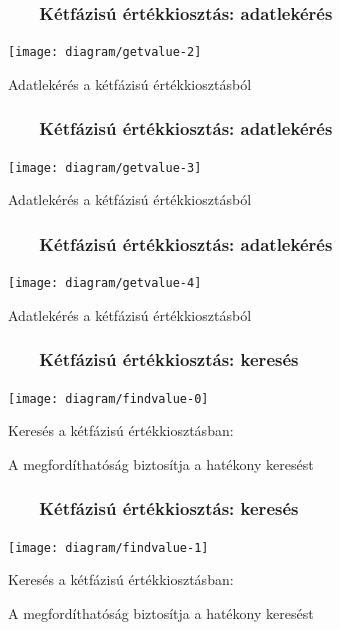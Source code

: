 \documentclass{beamer}
\newcommand{\slidetitle}[2]{\frametitle{{\small #1 ~ \ding{226} ~ } #2}}
\begin{document}
\begin{frame}[noframenumbering]
    \slidetitle{\sectiontitle}{Kétfázisú értékkiosztás: adatlekérés}
    
    \centering
    
    \texttt{[image: diagram/getvalue-2]}
    
    \hspace{0.7cm}
    
    Adatlekérés a kétfázisú értékkiosztásból
\end{frame}

\begin{frame}[noframenumbering]
    \slidetitle{\sectiontitle}{Kétfázisú értékkiosztás: adatlekérés}
    
    \centering
    
    \texttt{[image: diagram/getvalue-3]}
    
    \hspace{0.7cm}
    
    Adatlekérés a kétfázisú értékkiosztásból
\end{frame}

\begin{frame}[noframenumbering]
    \slidetitle{\sectiontitle}{Kétfázisú értékkiosztás: adatlekérés}
    
    \centering
    
    \texttt{[image: diagram/getvalue-4]}
    
    \hspace{0.7cm}
    
    Adatlekérés a kétfázisú értékkiosztásból
\end{frame}

\begin{frame}
    \slidetitle{\sectiontitle}{Kétfázisú értékkiosztás: keresés}
    
    \centering
    
    \texttt{[image: diagram/findvalue-0]}
    
    \vspace{0.5cm}
    
    Keresés a kétfázisú értékkiosztásban: \par
    A megfordíthatóság biztosítja a hatékony keresést
\end{frame}

\begin{frame}[noframenumbering]
    \slidetitle{\sectiontitle}{Kétfázisú értékkiosztás: keresés}
    
    \centering
    
    \texttt{[image: diagram/findvalue-1]}
    
    \vspace{0.5cm}
    
    Keresés a kétfázisú értékkiosztásban: \par
    A megfordíthatóság biztosítja a hatékony keresést
\end{frame}
\end{document}
